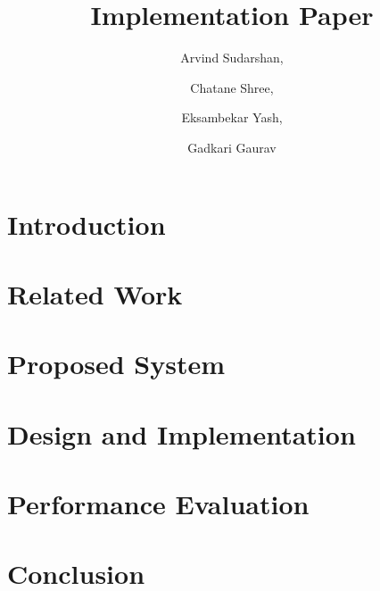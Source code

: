 \documentclass{IEEEtran}
\title{Implementation Paper}
\author{
  Arvind Sudarshan,
  \and
  Chatane Shree,
  \and
  Eksambekar Yash,
  \and
  Gadkari Gaurav
}
\begin{document}
  \maketitle

  \begin{abstract}
  \end{abstract}
  \begin{IEEEkeywords}
  \end{IEEEkeywords}

  \section{Introduction}

  \section{Related Work}

  \section{Proposed System}
  
  \section{Design and Implementation}
  
  \section{Performance Evaluation}

  \section{Conclusion}

  
  
\end{document}
